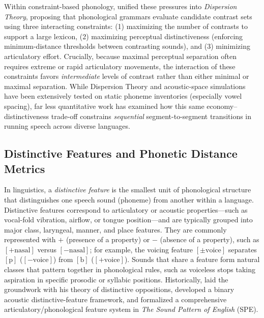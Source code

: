 \documentclass{interact}
\begin{document}
Within constraint-based phonology, \citet{flemming2004} unified these pressures into \emph{Dispersion Theory}, proposing that phonological grammars evaluate candidate contrast sets using three interacting constraints: (1) maximizing the number of contrasts to support a large lexicon, (2) maximizing perceptual distinctiveness (enforcing minimum-distance thresholds between contrasting sounds), and (3) minimizing articulatory effort. Crucially, because maximal perceptual separation often requires extreme or rapid articulatory movements, the interaction of these constraints favors \emph{intermediate} levels of contrast rather than either minimal or maximal separation. While Dispersion Theory and acoustic-space simulations have been extensively tested on static phoneme inventories (especially vowel spacing), far less quantitative work has examined how this same economy--distinctiveness trade-off constrains \emph{sequential} segment-to-segment transitions in running speech across diverse languages.

\subsection{Distinctive Features and Phonetic Distance Metrics}
In linguistics, a \emph{distinctive feature} is the smallest unit of phonological structure that distinguishes one speech sound (phoneme) from another within a language. Distinctive features correspond to articulatory or acoustic properties---such as vocal-fold vibration, airflow, or tongue position---and are typically grouped into major class, laryngeal, manner, and place features. They are commonly represented with $+$ (presence of a property) or $-$ (absence of a property), such as $[+\text{nasal}]$ versus $[-\text{nasal}]$; for example, the voicing feature $[\pm\text{voice}]$ separates $[\text{p}]$ ($[-\text{voice}]$) from $[\text{b}]$ ($[+\text{voice}]$). Sounds that share a feature form natural classes that pattern together in phonological rules, such as voiceless stops taking aspiration in specific prosodic or syllabic positions. Historically, \citet{trubetzkoy1939} laid the groundwork with his theory of distinctive oppositions, \citet{jakobson1952} developed a binary acoustic distinctive-feature framework, and \citet{chomsky1968} formalized a comprehensive articulatory/phonological feature system in \emph{The Sound Pattern of English} (SPE).
\end{document}
